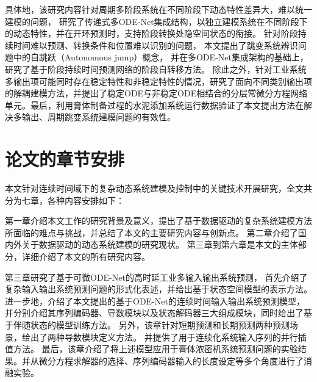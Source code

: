 具体地，该研究内容针对周期多阶段系统在不同阶段下动态特性差异大，难以统一建模的问题，
研究了传递式多ODE-Net集成结构，以独立建模系统在不同阶段下的动态特性，并在开环预测时，支持阶段转换处隐空间状态的衔接。
针对阶段持续时间难以预测、转换条件和位置难以识别的问题，
本文提出了跳变系统辨识问题中的自跳跃（Autonomous jump）概念，
并在多ODE-Net集成架构的基础上，研究了基于阶段持续时间预测网络的阶段自转移方法。
除此之外，针对工业系统多输出项可能同时存在稳定特性和非稳定特性的情况，研究了面向不同类别输出项的解耦建模方法，并提出了稳定ODE与非稳定ODE相结合的分层常微分方程网络单元。最后，利用膏体制备过程的水泥添加系统运行数据验证了本文提出方法在解决多输出、周期跳变系统建模问题的有效性。


\section{论文的章节安排}

本文针对连续时间域下的复杂动态系统建模及控制中的关键技术开展研究，全文共分为七章，各种内容安排如下：

第一章介绍本文工作的研究背景及意义，提出了基于数据驱动的复杂系统建模方法所面临的难点与挑战，并总结了本文的主要研究内容与创新点。
第二章介绍了国内外关于数据驱动的动态系统建模的研究现状。
第三章到第六章是本文的主体部分，详细介绍了本文的所有研究内容。


第三章研究了基于可微ODE-Net的高时延工业多输入输出系统预测，
首先介绍了复杂输入输出系统预测问题的形式化表述，并给出基于状态空间模型的表示方法。
进一步地，介绍了本文提出的基于ODE-Net的连续时间输入输出系统预测模型，并分别介绍其序列编码器、导数模块以及状态解码器三大组成模块，同时给出了基于伴随状态的模型训练方法。
另外，该章针对短期预测和长期预测两种预测场景，给出了两种导数模块定义方法。
并提供了用于连续化系统输入序列的并行插值方法。
最后，该章介绍了将上述模型应用于膏体浓密机系统预测问题的实验结果。并从微分方程求解器的选择、序列编码器输入的长度设定等多个角度进行了消融实验。



